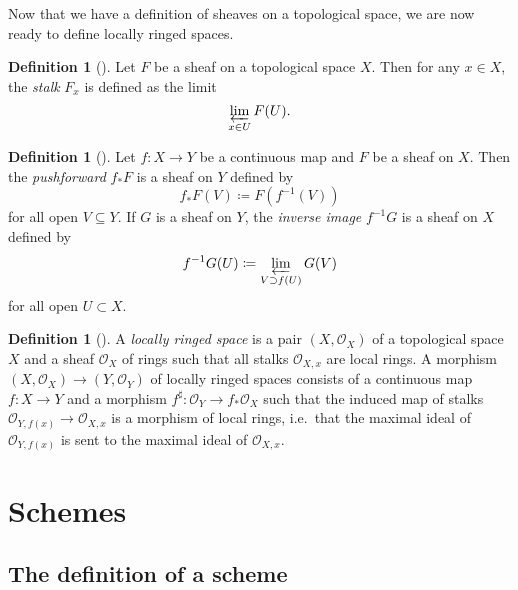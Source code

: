 \documentclass{amsart}
\theoremstyle{definition}
\newtheorem{defn}[thm]{Definition}
\theoremstyle{remark}
\theoremstyle{plain}
\theoremstyle{definition}
\theoremstyle{remark}
\newcommand{\mc}[1]{\mathcal{#1}}
\newcommand{\1}{\mathbf{1}}
\newcommand{\2}{\mathbf{2}}
\newcommand{\3}{\mathbf{3}}
\begin{document}
Now that we have a definition of sheaves on a topological space, we are now ready to define locally ringed spaces.

\begin{defn}[{\cite[\href{https://stacks.math.columbia.edu/tag/0078}{Tag 0078}]{stacks}}]
    Let $F$ be a sheaf on a topological space $X$. Then for any $x \in X$, the \textit{stalk} $F_x$ is defined as the limit
    \[ \varprojlim_{x \in U} F(U). \]
\end{defn}

\begin{defn}[{\cite[\href{https://stacks.math.columbia.edu/tag/008C}{Tag 008C}, \href{https://stacks.math.columbia.edu/tag/008F}{Tag 008F}]{stacks}}]
    Let $f \colon X \to Y$ be a continuous map and $F$ be a sheaf on $X$. Then the \textit{pushforward} $f_* F$ is a sheaf on $Y$ defined by
    \[ f_* F(V) \coloneqq F(f^{-1}(V)) \]
    for all open $V \subseteq Y$. If $G$ is a sheaf on $Y$, the \textit{inverse image} $f^{-1} G$ is a sheaf on $X$ defined by
    \[ f^{-1} G(U) \coloneqq \varprojlim_{V \supset f(U)} G(V) \]
    for all open $U \subset X$.
\end{defn}


\begin{defn}[{\cite[\href{https://stacks.math.columbia.edu/tag/01HB}{Tag 01HB}]{stacks}}]
    A \textit{locally ringed space} is a pair $(X,\mc{O}_X)$ of a topological space $X$ and a sheaf $\mc{O}_X$ of rings such that all stalks $\mc{O}_{X,x}$ are local rings. A morphism $(X, \mc{O}_X) \to (Y,\mc{O}_Y)$ of locally ringed spaces consists of a continuous map $f \colon X \to Y$ and a morphism $f^{\sharp} \colon \mc{O}_Y \to f_* \mc{O}_X$ such that the induced map of stalks $\mc{O}_{Y,f(x)} \to \mc{O}_{X,x}$ is a morphism of local rings, i.e.\ that the maximal ideal of $\mc{O}_{Y,f(x)}$ is sent to the maximal ideal of $\mc{O}_{X,x}$.
\end{defn}

\section{Schemes}

\subsection{The definition of a scheme}
\end{document}
